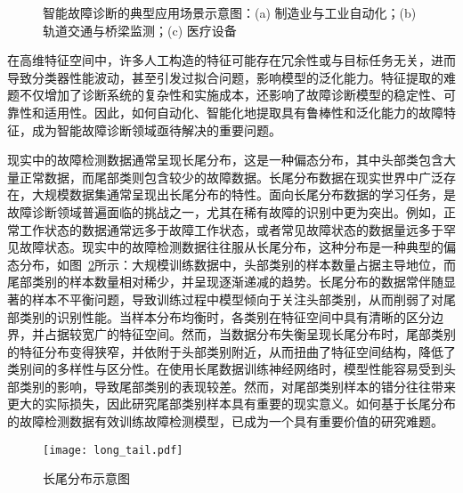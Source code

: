\documentclass[master]{thesis-uestc}
\begin{document}
\begin{figure}[h!]
    \centering
    \caption{智能故障诊断的典型应用场景示意图：(a) 制造业与工业自动化；(b) 轨道交通与桥梁监测；(c) 医疗设备}
    \label{fig:application_scenes}
\end{figure}

在高维特征空间中，许多人工构造的特征可能存在冗余性或与目标任务无关，进而导致分类器性能波动，甚至引发过拟合问题，影响模型的泛化能力。特征提取的难题不仅增加了诊断系统的复杂性和实施成本，还影响了故障诊断模型的稳定性、可靠性和适用性。因此，如何自动化、智能化地提取具有鲁棒性和泛化能力的故障特征，成为智能故障诊断领域亟待解决的重要问题。

现实中的故障检测数据通常呈现长尾分布，这是一种偏态分布，其中头部类包含大量正常数据，而尾部类则包含较少的故障数据。长尾分布数据在现实世界中广泛存在，大规模数据集通常呈现出长尾分布的特性。面向长尾分布数据的学习任务，是故障诊断领域普遍面临的挑战之一，尤其在稀有故障的识别中更为突出。例如，正常工作状态的数据通常远多于故障工作状态，或者常见故障状态的数据量远多于罕见故障状态。现实中的故障检测数据往往服从长尾分布，这种分布是一种典型的偏态分布，如图~\ref{fig_long_tail}所示：大规模训练数据中，头部类别的样本数量占据主导地位，而尾部类别的样本数量相对稀少，并呈现逐渐递减的趋势。长尾分布的数据常伴随显著的样本不平衡问题，导致训练过程中模型倾向于关注头部类别，从而削弱了对尾部类别的识别性能。当样本分布均衡时，各类别在特征空间中具有清晰的区分边界，并占据较宽广的特征空间。然而，当数据分布失衡呈现长尾分布时，尾部类别的特征分布变得狭窄，并依附于头部类别附近，从而扭曲了特征空间结构，降低了类别间的多样性与区分性。在使用长尾数据训练神经网络时，模型性能容易受到头部类别的影响，导致尾部类别的表现较差。然而，对尾部类别样本的错分往往带来更大的实际损失，因此研究尾部类别样本具有重要的现实意义。如何基于长尾分布的故障检测数据有效训练故障检测模型，已成为一个具有重要价值的研究难题。
\begin{figure}[h]
    \texttt{[image: long\_tail.pdf]}
    \caption{长尾分布示意图}
    \label{fig_long_tail}
\end{figure}
\end{document}
